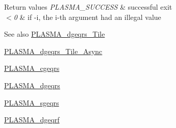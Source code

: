 \begin{DoxyRetVals}{Return values}
{\em P\+L\+A\+S\+M\+A\+\_\+\+S\+U\+C\+C\+E\+S\+S} & successful exit \\
\hline
{\em $<$0} & if -\/i, the i-\/th argument had an illegal value\\
\hline
\end{DoxyRetVals}
\begin{DoxySeeAlso}{See also}
\hyperlink{group__double__Tile_ga6575f94967997a528918e5c2d4ff43b3_ga6575f94967997a528918e5c2d4ff43b3}{P\+L\+A\+S\+M\+A\+\_\+dgeqrs\+\_\+\+Tile} 

\hyperlink{group__double__Tile__Async_gad81f46c405c0b4fed0067a2d7928847a_gad81f46c405c0b4fed0067a2d7928847a}{P\+L\+A\+S\+M\+A\+\_\+dgeqrs\+\_\+\+Tile\+\_\+\+Async} 

\hyperlink{group__PLASMA__Complex32__t_ga961a4dfc433c5086670b813e5fa53bbf_ga961a4dfc433c5086670b813e5fa53bbf}{P\+L\+A\+S\+M\+A\+\_\+cgeqrs} 

\hyperlink{group__double_gaa133b69ef592ef01466fd93b6ac7689d_gaa133b69ef592ef01466fd93b6ac7689d}{P\+L\+A\+S\+M\+A\+\_\+dgeqrs} 

\hyperlink{group__float_ga15cad3c163c8d1137d13d66594652b7d_ga15cad3c163c8d1137d13d66594652b7d}{P\+L\+A\+S\+M\+A\+\_\+sgeqrs} 

\hyperlink{group__double_gaad8136b3520b4bda7261d3f921c8a740_gaad8136b3520b4bda7261d3f921c8a740}{P\+L\+A\+S\+M\+A\+\_\+dgeqrf} 
\end{DoxySeeAlso}
\hypertarget{group__double_ga90d8245b7c9b7124c35c485f0e4f63b7_ga90d8245b7c9b7124c35c485f0e4f63b7}{}
